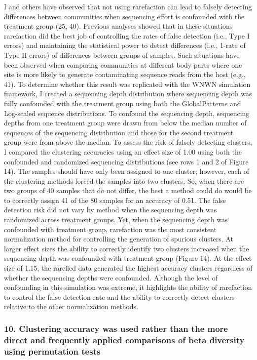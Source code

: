 \documentclass[
]{article}
\begin{document}
I and others have observed that not using rarefaction can lead to
falsely detecting differences between communities when sequencing effort
is confounded with the treatment group (25, 40). Previous analyses
showed that in these situations rarefaction did the best job of
controlling the rates of false detection (i.e., Type I errors) and
maintaining the statistical power to detect differences (i.e., 1-rate of
Type II errors) of differences between groups of samples. Such
situations have been observed when comparing communities at different
body parts where one site is more likely to generate contaminating
sequence reads from the host (e.g., 41). To determine whether this
result was replicated with the WNWN simulation framework, I created a
sequencing depth distribution where sequencing depth was fully
confounded with the treatment group using both the GlobalPatterns and
Log-scaled sequence distributions. To confound the sequencing depth,
sequencing depths from one treatment group were drawn from below the
median number of sequences of the sequencing distribution and those for
the second treatment group were from above the median. To assess the
risk of falsely detecting clusters, I compared the clustering accuracies
using an effect size of 1.00 using both the confounded and randomized
sequencing distributions (see rows 1 and 2 of Figure 14). The samples
should have only been assigned to one cluster; however, each of the
clustering methods forced the samples into two clusters. So, when there
are two groups of 40 samples that do not differ, the best a method could
do would be to correctly assign 41 of the 80 samples for an accuracy of
0.51. The false detection risk did not vary by method when the
sequencing depth was randomized across treatment groups. Yet, when the
sequencing depth was confounded with treatment group, rarefaction was
the most consistent normalization method for controlling the generation
of spurious clusters. At larger effect sizes the ability to correctly
identify two clusters increased when the sequencing depth was confounded
with treatment group (Figure 14). At the effect size of 1.15, the
rarefied data generated the highest accuracy clusters regardless of
whether the sequencing depths were confounded. Although the level of
confounding in this simulation was extreme, it highlights the ability of
rarefaction to control the false detection rate and the ability to
correctly detect clusters relative to the other normalization methods.

\hypertarget{clustering-accuracy-was-used-rather-than-the-more-direct-and-frequently-applied-comparisons-of-beta-diversity-using-permutation-tests}{%
\subsubsection{10. Clustering accuracy was used rather than the more
direct and frequently applied comparisons of beta diversity using
permutation
tests}\label{clustering-accuracy-was-used-rather-than-the-more-direct-and-frequently-applied-comparisons-of-beta-diversity-using-permutation-tests}}
\end{document}

